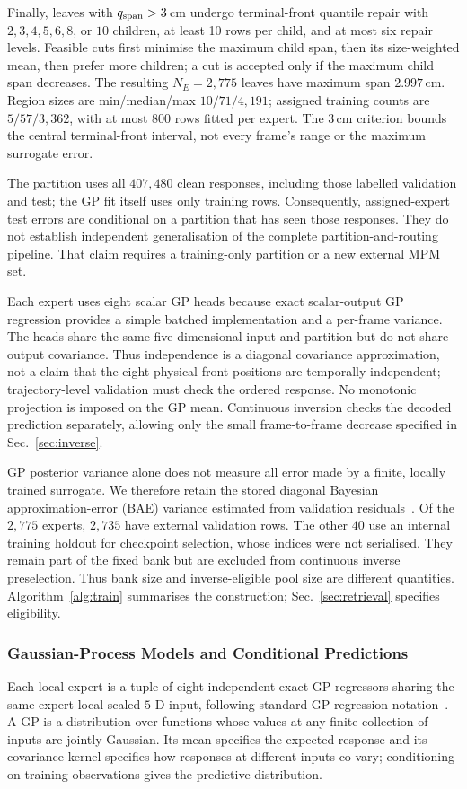 Finally, leaves with $q_{\rm span}>3$\,cm undergo terminal-front quantile
repair with $2,3,4,5,6,8$, or $10$ children, at least 10 rows per child,
and at most six repair levels. Feasible cuts first minimise the maximum
child span, then its size-weighted mean, then prefer more children;
a cut is accepted only if the maximum child span decreases.
The resulting $N_E=2{,}775$ leaves have maximum span $2.997$\,cm.
Region sizes are min/median/max $10/71/4{,}191$; assigned training
counts are $5/57/3{,}362$, with at most 800 rows fitted per expert.
The 3\,cm criterion bounds the central terminal-front interval, not
every frame's range or the maximum surrogate error.

The partition uses all $407{,}480$ clean responses, including those
labelled validation and test; the GP fit itself uses only training rows.
Consequently, assigned-expert test errors are conditional on a partition
that has seen those responses. They do not establish independent
generalisation of the complete partition-and-routing pipeline.
That claim requires a training-only partition or a new external MPM set.

Each expert uses eight
scalar GP heads because exact scalar-output GP regression provides a
simple batched implementation and a per-frame variance.  The heads share
the same five-dimensional input and partition but do not share output
covariance.  Thus independence is a diagonal covariance approximation,
not a claim that the eight physical front positions are temporally
independent; trajectory-level validation must check the ordered response. No
monotonic projection is imposed on the GP mean. Continuous inversion
checks the decoded prediction separately, allowing only the small
frame-to-frame decrease specified in Sec.~\ref{sec:inverse}.

GP posterior variance alone does not measure all error made by a finite,
locally trained surrogate. We therefore retain the stored diagonal
Bayesian approximation-error (BAE) variance estimated from validation
residuals~\cite{kaipio2005statistical}. Of the $2{,}775$ experts,
$2{,}735$ have external validation rows. The other $40$ use an internal
training holdout for checkpoint selection, whose indices were not
serialised. They remain part of the fixed bank but are excluded
from continuous inverse preselection. Thus bank size and inverse-eligible
pool size are different quantities. Algorithm~\ref{alg:train}
summarises the construction; Sec.~\ref{sec:retrieval} specifies eligibility.


\subsubsection{Gaussian-Process Models and Conditional Predictions}
\label{sec:surr-experts}
Each local expert is a tuple of eight independent exact GP regressors
sharing the same expert-local scaled $5$-D input, following standard GP
regression notation~\cite{rasmussen2006gaussian}. A GP is a distribution
over functions whose values at any finite collection of inputs are
jointly Gaussian. Its mean specifies the expected response and its
covariance kernel specifies how responses at different inputs co-vary;
conditioning on training observations gives the predictive distribution.

